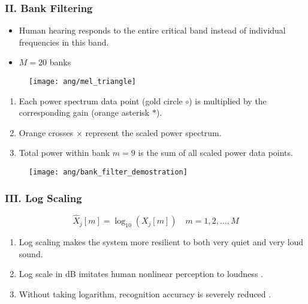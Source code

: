 \begin{frame}
\frametitle{II. Bank Filtering}
\begin{itemize}
	\item Human hearing responds to the entire critical band instead of individual frequencies in this band.
	\item $M = 20$ banks
\end{itemize}

\begin{figure}[H]
\centering
\texttt{[image: ang/mel\_triangle]}
\end{figure}
\end{frame}


\begin{frame}
\begin{enumerate}
\item Each power spectrum data point (\textcolor{gold_matlab}{gold circle $\circ$}) is multiplied by the corresponding gain (\textcolor{orange_matlab}{orange asterisk $*$}).
\item \textcolor{orange_matlab}{Orange crosses $\times$} represent the scaled power spectrum.
\item Total power within bank $m=9$ is the sum of all scaled power data points.
\end{enumerate}

\begin{figure}[H]
\centering
\texttt{[image: ang/bank\_filter\_demostration]}
\end{figure}
\end{frame}


\begin{frame}
\frametitle{III. Log Scaling}
\begin{equation}
\hat{X}_j[m] = \log_{10}(X_j[m]) \quad m = 1, 2, \dots, M
\end{equation}

\begin{enumerate}
\item Log scaling makes the system more resilient to both very quiet and very loud sound.
\item Log scale in dB imitates human nonlinear perception to loudness \cite{farin2008mathematical}.
\item Without taking logarithm, recognition accuracy is severely reduced \cite{tan2008automatic}.
\end{enumerate}
\end{frame}

